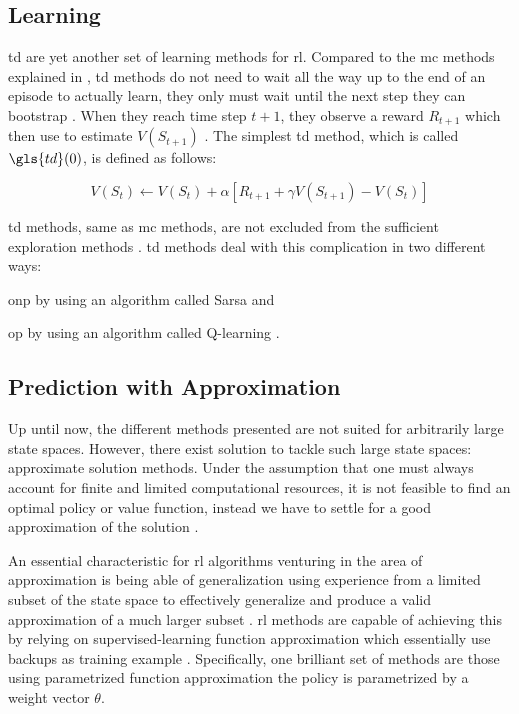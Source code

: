 \documentclass{seal_thesis}
\begin{document}
\subsection{ Learning}
\label{subsec:td_learning}

\gls{td} are yet another set of learning methods for \gls{rl}. Compared to the \gls{mc} methods explained in , \gls{td} methods do not need to wait all the way up to the end of an episode to actually learn, they only must wait until the next step \ie they can bootstrap \cite[p. 128]{Sutton2017}. When they reach time step $t+1$, they observe a reward $R_{t+1}$ which then use to estimate $V(S_{t+1})$ \cite[p. 128]{Sutton2017}. The simplest \gls{td} method, which is called $\gls{td}(0)$, is defined as follows:

\begin{equation}
\label{eq:td_update}
	V(S_t) \leftarrow V(S_t) + \alpha [R_{t+1} + \gamma V(S_{t+1}) - V(S_t)]
\end{equation}

\gls{td} methods, same as \gls{mc} methods, are not  excluded from the sufficient exploration methods \cite[p. 147]{Sutton2017}. \gls{td} methods deal with this complication in two different ways:
\begin{enumerate*}
	\item \gls{onp} by using an algorithm called Sarsa and
	\item \gls{op} by using an algorithm called Q-learning \cite[p. 128]{Sutton2017}.
\end{enumerate*}

\subsection{ Prediction with Approximation}
\label{subsec:onpol_pred}

Up until now, the different methods presented are not suited for arbitrarily large state spaces. However, there exist solution to tackle such large state spaces: approximate solution methods. Under the assumption that one must always account for finite and limited computational resources, it is not feasible to find an optimal policy or value function, instead we have to settle for a good approximation of the solution \cite[p. 189]{Sutton2017}.

An essential characteristic for \gls{rl} algorithms venturing in the area of approximation is being able of generalization \ie using experience from a limited subset of the state space to effectively generalize and produce a valid approximation of a much larger subset  \cite[p. 189]{Sutton2017}. \gls{rl} methods are capable of achieving this by relying on supervised-learning function approximation which essentially use backups as training example \cite[p. 222]{Sutton2017}. Specifically, one brilliant set of methods are those using parametrized function approximation \ie the policy is parametrized by a weight vector $\theta$.
\end{document}
